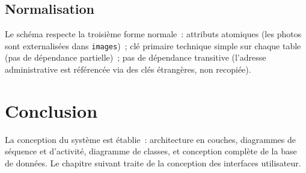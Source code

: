 \subsection{Normalisation}
Le schéma respecte la troisième forme normale~: attributs atomiques (les photos
sont externalisées dans \texttt{images})~; clé primaire technique simple sur
chaque table (pas de dépendance partielle)~; pas de dépendance transitive
(l'adresse administrative est référencée via des clés étrangères, non
recopiée).

\section*{Conclusion}
La conception du système est établie~: architecture en couches, diagrammes de
séquence et d'activité, diagramme de classes, et conception complète de la base
de données. Le chapitre suivant traite de la conception des interfaces
utilisateur.
